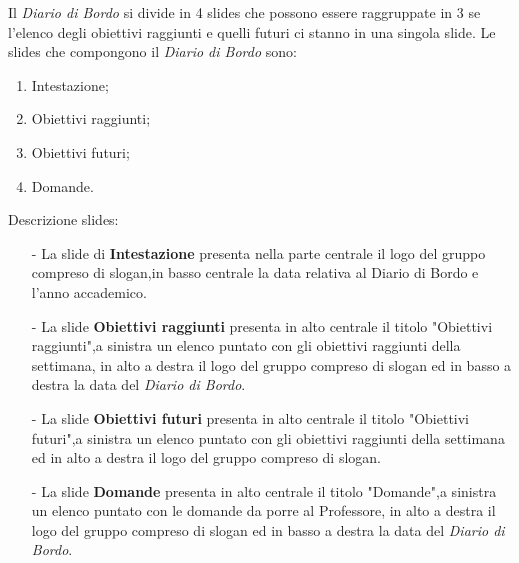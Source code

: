 Il \textit{Diario di Bordo} si divide in 4 slides che possono essere raggruppate in 3 se l'elenco degli obiettivi raggiunti e quelli futuri ci stanno
in una singola slide.
Le slides che compongono il \textit{Diario di Bordo} sono:
\begin{enumerate}
    \item Intestazione;
    \item Obiettivi raggiunti;
    \item Obiettivi futuri;
    \item Domande.
\end{enumerate}
Descrizione slides:
\begin{itemize}
    \item [-] La slide di \textbf{Intestazione} presenta nella parte centrale il logo del gruppo compreso di slogan,in basso centrale la data relativa al Diario di Bordo e l'anno accademico.
    \item [-] La slide \textbf{Obiettivi raggiunti} presenta in alto centrale il titolo "Obiettivi raggiunti",a sinistra un elenco puntato con gli obiettivi raggiunti
    della settimana, in alto a destra il logo del gruppo compreso di slogan ed in basso a destra la data del \textit{Diario di Bordo}.
    \item [-] La slide \textbf{Obiettivi futuri} presenta in alto centrale il titolo "Obiettivi futuri",a sinistra un elenco puntato con gli obiettivi raggiunti
    della settimana ed in alto a destra il logo del gruppo compreso di slogan.
    \item [-] La slide \textbf{Domande} presenta in alto centrale il titolo "Domande",a sinistra un elenco puntato con le domande da porre al Professore, in alto a destra il logo del gruppo compreso di slogan ed in basso 
    a destra la data del \textit{Diario di Bordo}.
\end{itemize}